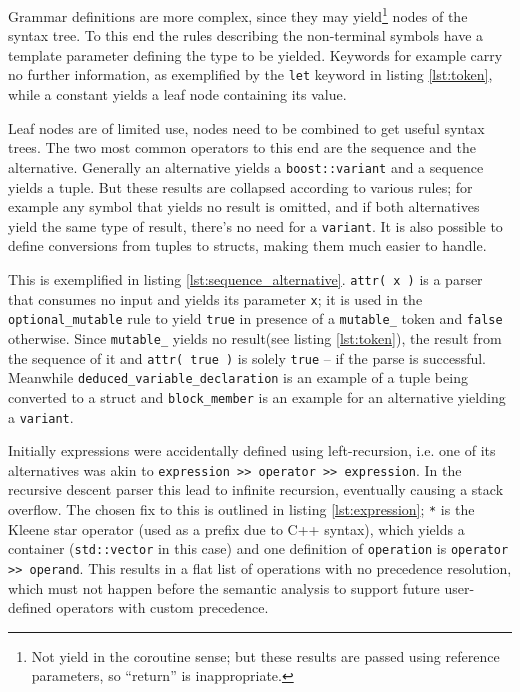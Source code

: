 		Grammar definitions are more complex, since they may yield\footnote{Not yield in the coroutine sense; but these results are passed using reference parameters, so ``return'' is inappropriate.} nodes of the syntax tree. To this end the rules describing the non-terminal symbols have a template parameter defining the type to be yielded. Keywords for example carry no further information, as exemplified by the \lstinline$let$ keyword in listing \ref{lst:token}, while a constant yields a leaf node containing its value.
		
		
		Leaf nodes are of limited use, nodes need to be combined to get useful syntax trees. The two most common operators to this end are the sequence and the alternative. Generally an alternative yields a \lstinline$boost::variant$ and a sequence yields a tuple. But these results are collapsed according to various rules\cite{spirit_attributes}; for example any symbol that yields no result is omitted, and if both alternatives yield the same type of result, there's no need for a \lstinline$variant$. It is also possible to define conversions from tuples to structs, making them much easier to handle.
		
		This is exemplified in listing \ref{lst:sequence_alternative}. \lstinline$attr( x )$ is a parser that consumes no input and yields its parameter \lstinline$x$; it is used in the \lstinline$optional_mutable$ rule to yield \lstinline$true$ in presence of a \lstinline$mutable_$ token and \lstinline$false$ otherwise. Since \lstinline$mutable_$ yields no result(see listing \ref{lst:token}), the result from the sequence of it and \lstinline$attr( true )$ is solely \lstinline$true$ -- if the parse is successful. Meanwhile \lstinline$deduced_variable_declaration$ is an example of a tuple being converted to a struct and \lstinline$block_member$ is an example for an alternative yielding a \lstinline$variant$.
		
		
		Initially expressions were accidentally defined using left-recursion, i.e. one of its alternatives was akin to \lstinline$expression >> operator >> expression$. In the recursive descent parser this lead to infinite recursion, eventually causing a stack overflow. The chosen fix to this is outlined in listing \ref{lst:expression}; \lstinline$*$ is the Kleene star operator (used as a prefix due to C++ syntax), which yields a container (\lstinline$std::vector$ in this case) and one definition of \lstinline$operation$ is \lstinline$operator >> operand$. This results in a flat list of operations with no precedence resolution, which must not happen before the semantic analysis to support future user-defined operators with custom precedence.
		
